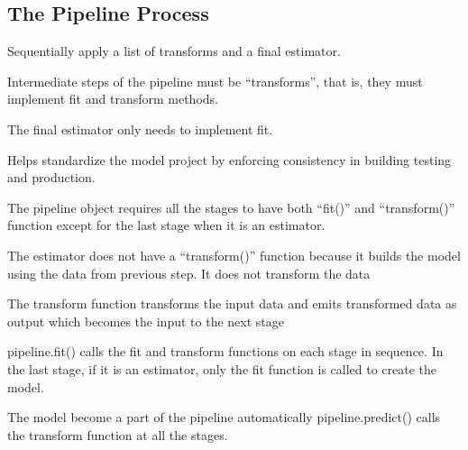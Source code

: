 	\subsection{The Pipeline Process}
	\begin{numberedlist}
		\item Sequentially apply a list of transforms and a final estimator.
		\item Intermediate steps of the pipeline must be ``transforms'', that is, they must implement fit and transform methods.
		\item The final estimator only needs to implement fit.
		\item Helps standardize the model project by enforcing consistency in building testing and production.
	\end{numberedlist}

	\begin{bulletedlist}
		\item The pipeline object requires all the stages to have both ``fit()'' and ``transform()'' function except for the last stage when it is an estimator.
		\item The estimator does not have a ``transform()'' function because it builds the model using the data from previous step. It does not transform the data
		\item The transform function transforms the input data and emits transformed data as output which becomes the input to the next stage
		\item pipeline.fit() calls the fit and transform functions on each stage in sequence. In the last stage, if it is an estimator, only the fit function is called to create the model.
		\item The model become a part of the pipeline automatically pipeline.predict() calls the transform function at all the stages.
	\end{bulletedlist}
